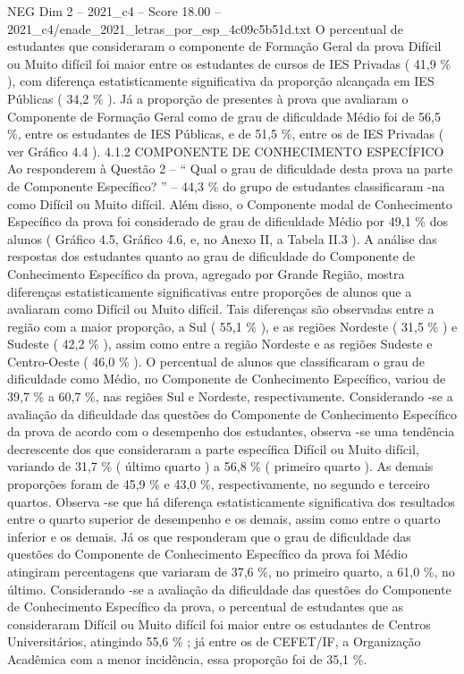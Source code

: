 \begin{textsample}{NEG Dim 2 – 2021\_c4 – Score 18.00 – 2021\_c4/enade\_2021\_letras\_por\_esp\_4c09c5b51d.txt}
O percentual de estudantes que consideraram o componente de Formação Geral da prova Difícil ou Muito difícil foi maior entre os estudantes de cursos de IES Privadas ( 41,9 \% ), com diferença estatisticamente significativa da proporção alcançada em IES Públicas ( 34,2 \% ).
Já a proporção de presentes à prova que avaliaram o Componente de Formação Geral como de grau de dificuldade Médio foi de 56,5 \%, entre os estudantes de IES Públicas, e de 51,5 \%, entre os de IES Privadas ( ver Gráfico 4.4 ). 4.1.2 COMPONENTE DE CONHECIMENTO ESPECÍFICO Ao responderem à Questão 2 – “ Qual o grau de dificuldade desta prova na parte de Componente Específico? ” – 44,3 \% do grupo de estudantes classificaram -na como Difícil ou Muito difícil.
Além disso, o Componente modal de Conhecimento Específico da prova foi considerado de grau de dificuldade Médio por 49,1 \% dos alunos ( Gráfico 4.5, Gráfico 4.6, e, no Anexo II, a Tabela II.3 ).
A análise das respostas dos estudantes quanto ao grau de dificuldade do Componente de Conhecimento Específico da prova, agregado por Grande Região, mostra diferenças estatisticamente significativas entre proporções de alunos que a avaliaram como Difícil ou Muito difícil.
Tais diferenças são observadas entre a região com a maior proporção, a Sul ( 55,1 \% ), e as regiões Nordeste ( 31,5 \% ) e Sudeste ( 42,2 \% ), assim como entre a região Nordeste e as regiões Sudeste e Centro-Oeste ( 46,0 \% ).
O percentual de alunos que classificaram o grau de dificuldade como Médio, no Componente de Conhecimento Específico, variou de 39,7 \% a 60,7 \%, nas regiões Sul e Nordeste, respectivamente.
Considerando -se a avaliação da dificuldade das questões do Componente de Conhecimento Específico da prova de acordo com o desempenho dos estudantes, observa -se uma tendência decrescente dos que consideraram a parte específica Difícil ou Muito difícil, variando de 31,7 \% ( último quarto ) a 56,8 \% ( primeiro quarto ).
As demais proporções foram de 45,9 \% e 43,0 \%, respectivamente, no segundo e terceiro quartos.
Observa -se que há diferença estatisticamente significativa dos resultados entre o quarto superior de desempenho e os demais, assim como entre o quarto inferior e os demais.
Já os que responderam que o grau de dificuldade das questões do Componente de Conhecimento Específico da prova foi Médio atingiram percentagens que variaram de 37,6 \%, no primeiro quarto, a 61,0 \%, no último.
Considerando -se a avaliação da dificuldade das questões do Componente de Conhecimento Específico da prova, o percentual de estudantes que as consideraram Difícil ou Muito difícil foi maior entre os estudantes de Centros Universitários, atingindo 55,6 \% ; já entre os de CEFET/IF, a Organização Acadêmica com a menor incidência, essa proporção foi de 35,1 \%.

\end{textsample}
